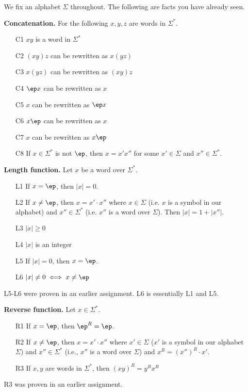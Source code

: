 



\renewcommand\TITLE{Test 1 Part B}
\renewcommand\AUTHOR{David Campbell}
\renewcommand\EMAIL{djcampbell2@cougars.ccis.edu}


\topmatter


We fix an alphabet $\Sigma$ throughout.
The following are facts you have already seen.

{\bf Concatenation.}
For the following $x,y,z$ are words in $\Sigma^*$.
\begin{enumerate}
\item[C1] $xy$ is a word in $\Sigma^*$
\item[C2] $(xy)z$ can be rewritten as $x(yz)$
\item[C3] $x(yz)$ can be rewritten as $(xy)z$
\item[C4] $\ep x$ can be rewritten as $x$
\item[C5] $x$ can be rewritten as $\ep x$
\item[C6] $x\ep$ can be rewritten as $x$
\item[C7] $x$ can be rewritten as $x\ep$
\item[C8] If $x \in \Sigma^*$ is not $\ep$, then 
$x = x'x''$ for some $x' \in \Sigma$ and $x'' \in \Sigma^*$.
\end{enumerate}

{\bf Length function.}
Let $x$ be a word over $\Sigma^*$.
\begin{enumerate}
\item[L1] If $x = \ep$, then $|x| = 0$.
\item[L2] If $x \neq \ep$, then $x = x' \cdot x''$ where
$x \in \Sigma$ (i.e. $x$ is a symbol in our alphabet)
and $x'' \in \Sigma^*$ (i.e. $x''$ is a word over $\Sigma$).
Then $|x| = 1 + |x''|$.
\item[L3] $|x| \geq 0$
\item[L4] $|x|$ is an integer 
\item[L5] If $|x| = 0$, then $x = \ep$.
\item[L6] $|x| \neq 0 \iff x \neq \ep$
\end{enumerate}
L5-L6 were proven in an earlier assignment.
L6 is essentially L1 and L5.


{\bf Reverse function.} 
Let $x \in \Sigma^*$.
\begin{enumerate}
\item[R1] If $x = \ep$, then $\ep^R = \ep$.
\item[R2] If $x \neq \ep$, then $x = x'\cdot x''$ where
$x' \in \Sigma$ ($x'$ is a symbol in our alphabet $\Sigma$) 
and $x'' \in \Sigma^*$ (i.e., $x''$ is a word over $\Sigma$) 
and $x^R = (x'')^R \cdot x'$.
\item[R3] If $x,y$ are words in $\Sigma^*$, then
$(xy)^R = y^R x^R$
\end{enumerate}
R3 was proven in an earlier assignment.


